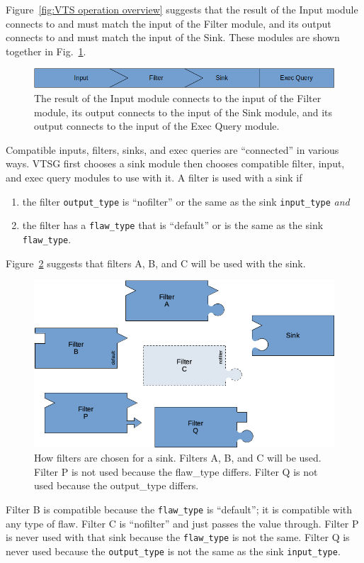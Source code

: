 \label{sec:connecting inputs, filters, and sinks}
Figure~\ref{fig:VTS operation overview} suggests that the result of the Input module
connects to and must match the input of the Filter module, and its output connects to
and must match the input of the Sink.  These modules are shown together in
Fig.~\ref{fig:input, filter, and sink}.
\begin{figure}[tbp]
  \centerline{\includegraphics[width=\linewidth]{fig_input_filter_sink.png}}
  \caption{The result of the Input module connects to the input of the Filter module,
    its output connects to the input of the Sink module, and its output connects
    to the input of the Exec Query module.
  }
  \label{fig:input, filter, and sink}
\end{figure}
Compatible inputs, filters, sinks, and exec queries are ``connected'' in various
ways.
VTSG first chooses a sink module then chooses compatible filter, input, and exec
query modules to
use with it.
\label{sec:compatible modules}
A filter is used with a sink if
\begin{enumerate}[nosep]
\item the filter \verb|output_type| is ``nofilter'' or the same as the sink
  \verb|input_type| \emph{and}
\item the filter has a \verb|flaw_type| that is ``default'' or is the same as the
  sink \verb|flaw_type|.
\end{enumerate}
Figure~\ref{fig:how filters fit a sink} suggests that filters A, B, and C will
be used with the sink.
\begin{figure}[tbp]
  \centerline{\includegraphics[width=.8\linewidth]{fig_filters_and_sinks.png}}
  \caption{How filters are chosen for a sink.  Filters A, B, and C will be used.
    Filter P is not used because the flaw\_type differs.
    Filter Q is not used because the output\_type differs.
  }
  \label{fig:how filters fit a sink}
\end{figure}
Filter B is compatible because the \verb|flaw_type| is
``default''; it is compatible with any type of flaw.  Filter C is ``nofilter'' and
just passes the value through.  Filter P is never used with that sink because
the \verb|flaw_type| is not the same.
Filter Q is never used because the \verb|output_type| is not the same as the
sink \verb|input_type|.

